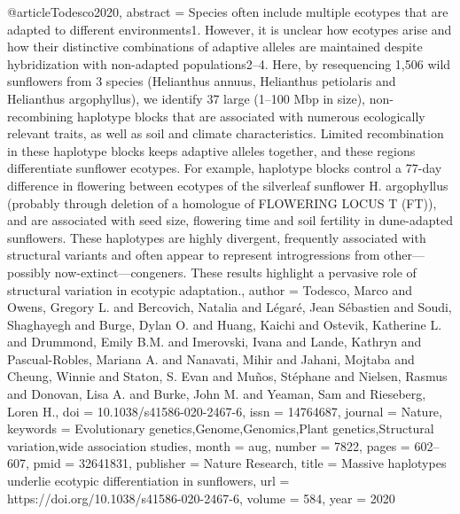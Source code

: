 @article{Todesco2020,
abstract = {Species often include multiple ecotypes that are adapted to different environments1. However, it is unclear how ecotypes arise and how their distinctive combinations of adaptive alleles are maintained despite hybridization with non-adapted populations2–4. Here, by resequencing 1,506 wild sunflowers from 3 species (Helianthus annuus, Helianthus petiolaris and Helianthus argophyllus), we identify 37 large (1–100 Mbp in size), non-recombining haplotype blocks that are associated with numerous ecologically relevant traits, as well as soil and climate characteristics. Limited recombination in these haplotype blocks keeps adaptive alleles together, and these regions differentiate sunflower ecotypes. For example, haplotype blocks control a 77-day difference in flowering between ecotypes of the silverleaf sunflower H. argophyllus (probably through deletion of a homologue of FLOWERING LOCUS T (FT)), and are associated with seed size, flowering time and soil fertility in dune-adapted sunflowers. These haplotypes are highly divergent, frequently associated with structural variants and often appear to represent introgressions from other—possibly now-extinct—congeners. These results highlight a pervasive role of structural variation in ecotypic adaptation.},
author = {Todesco, Marco and Owens, Gregory L. and Bercovich, Natalia and L{\'{e}}gar{\'{e}}, Jean S{\'{e}}bastien and Soudi, Shaghayegh and Burge, Dylan O. and Huang, Kaichi and Ostevik, Katherine L. and Drummond, Emily B.M. and Imerovski, Ivana and Lande, Kathryn and Pascual-Robles, Mariana A. and Nanavati, Mihir and Jahani, Mojtaba and Cheung, Winnie and Staton, S. Evan and Mu{\~{n}}os, St{\'{e}}phane and Nielsen, Rasmus and Donovan, Lisa A. and Burke, John M. and Yeaman, Sam and Rieseberg, Loren H.},
doi = {10.1038/s41586-020-2467-6},
issn = {14764687},
journal = {Nature},
keywords = {Evolutionary genetics,Genome,Genomics,Plant genetics,Structural variation,wide association studies},
month = {aug},
number = {7822},
pages = {602--607},
pmid = {32641831},
publisher = {Nature Research},
title = {{Massive haplotypes underlie ecotypic differentiation in sunflowers}},
url = {https://doi.org/10.1038/s41586-020-2467-6},
volume = {584},
year = {2020}
}
